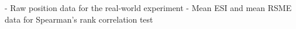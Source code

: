 - Raw position data for the real-world experiment
- Mean ESI and mean RSME data for Spearman's rank correlation test